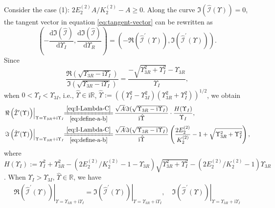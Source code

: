 \documentclass[11pt,reqno]{amsart}
\newcommand{\ii}{\mathrm{i}}
\newcommand{\dd}{\mathrm{d}}
\numberwithin{equation}{section}
\begin{document}
\begin{proof-spec-cn}
	
	Consider the case (1): $2E^{(2)}_2A/K^{(2)}_2-A \ge 0$.
	Along the curve ${\Im}(\hat{\mathcal{I}} (\Upsilon))=0$, the tangent vector in equation \eqref{eq:tangent-vector} can be rewritten as
	\begin{equation}\label{eq:tan-vec-Lambda-I}
		\left(-\frac{\dd {\Im}( \hat{\mathcal{I}} )}{\dd \Upsilon_I},\frac{\dd {\Im}(\hat{\mathcal{I}} )}{\dd \Upsilon_R} \right)=\left(-{\Re}\left(\hat{\mathcal{I}}^{\prime}(\Upsilon) \right),{\Im}\left(\hat{\mathcal{I}}^{\prime}(\Upsilon)\right)\right).
	\end{equation}
Since
	\begin{equation}\label{eq:define-a-b}
		\frac{\Re(\sqrt{\Upsilon_{3R}-\ii \Upsilon_I})}{\Im(\sqrt{\Upsilon_{3R}-\ii \Upsilon_I})}
		=\frac{-\sqrt{\Upsilon_{3R}^2+\Upsilon_I^2}-\Upsilon_{3R}}{\Upsilon_I},  
	\end{equation}
	when $0<\Upsilon_I<\Upsilon_{3I}$, i.e., $\hat{\Upsilon}\in \ii \mathbb{R}$, $\hat{\Upsilon}:=((\Upsilon_I^2-\Upsilon_{3I}^2)(\Upsilon_{3R}^2+ \Upsilon_I^2))^{1/2}$, we obtain
	\begin{equation}\nonumber
		\begin{split}
			\left.\Re\left(\hat{\mathcal{I}}^{\prime}(\Upsilon)\right)\right|_{\Upsilon=\Upsilon_{3R}+\ii \Upsilon_I} \!\!
			\xlongequal[\eqref{eq:define-a-b}]{\eqref{eq:I-Lambda-C}}&\,
			\frac{\sqrt{A}\Im(\sqrt{\Upsilon_{3R}-\ii \Upsilon_I}) }{\ii \hat{\Upsilon}}\cdot\frac{H(\Upsilon_I)}{\Upsilon_I},\\
			\left.\Im\left(\hat{\mathcal{I}}^{\prime}(\Upsilon)\right)\right|_{\Upsilon=\Upsilon_{3R}+\ii \Upsilon_I} \!\!
			\xlongequal[\eqref{eq:define-a-b}]{\eqref{eq:I-Lambda-C}} &\, 	\frac{ \sqrt{A}\Im(\sqrt{\Upsilon_{3R}-\ii \Upsilon_I})}{\ii  \hat{\Upsilon}}\left(\frac{2 E^{(2)}_2}{  K^{(2)}_2}-1 
			+\sqrt{\Upsilon_{3R}^2+\Upsilon_I^2}\right),
		\end{split} 
	\end{equation} 
	where $H(\Upsilon_I):= \Upsilon_I^2+\Upsilon_{3R}^2-(2 E^{(2)}_2/K^{(2)}_2-1-\Upsilon_{3R})\sqrt{\Upsilon_{3R}^2+\Upsilon_I^2}-(2 E^{(2)}_2/K^{(2)}_2-1)\Upsilon_{3R}$.
	When $\Upsilon_{I}>\Upsilon_{3I}$, $\hat{\Upsilon}\in \mathbb{R}$, we have
	\begin{equation}\label{eq:I-U}
		\begin{split}
			\left.\Re\left(\hat{\mathcal{I}}^{\prime}(\Upsilon)\right)\right|_{\Upsilon=\Upsilon_{3R}+\ii \Upsilon_I} \!\!\!
			=\left.\Im\left(\hat{\mathcal{I}}^{\prime}(\Upsilon)\right)\right|_{\Upsilon=\Upsilon_{3R}+\ii \Upsilon_I},\quad 
			\left.\Im\left(\hat{\mathcal{I}}^{\prime}(\Upsilon)\right)\right|_{\Upsilon=\Upsilon_{3R}+\ii \Upsilon_I} \!\!\!

\end{split}
\end{equation}
\end{proof-spec-cn}
\end{document}
